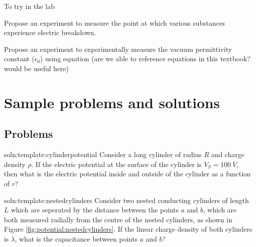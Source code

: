 \begin{chapteractivity}{To try in the lab}
{
\item Propose an experiment to measure the point at which various substances experience electric breakdown.
\item Propose an experiment to experimentally measure the vacuum permittivity constant ($\epsilon_0$) using equation (are we able to reference equations in this textbook? would be useful here)
}
\end{chapteractivity}

\newpage
\section{Sample problems and solutions}

\subsection{Problems}
\begin{problem}{soln:template:cylinderpotential}{\label{prob:template:cylinderpotential} 
Consider a long cylinder of radius $R$ and charge density $\rho$. If the electric potential at the surface of the cylinder is $V_S = \SI{100}{V}$, then what is the electric potential inside and outside of the cylinder as a function of $r$?}

\end{problem}

\begin{problem}{soln:template:nestedcylinders}{\label{prob:template:nestedcylinders} 
		Consider two nested conducting cylinders of length $L$ which are seperated by the distance between the points $a$ and $b$, which are both measured radially from the centre of the nested cylinders, as shown in Figure \ref{fig:potential:nestedcylinders}. If the linear charge density of both cylinders is $\lambda$, what is the capacitance between points $a$ and $b$?}
	
	
\end{problem}
\newpage

